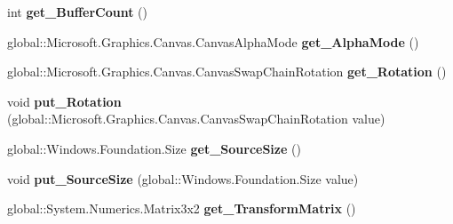 \begin{DoxyCompactItemize}
\item 
\mbox{\label{interface_microsoft_1_1_graphics_1_1_canvas_1_1_i_canvas_swap_chain_a33e552e317fa0af44a3768d918cfc3b1}} 
int {\bfseries get\+\_\+\+Buffer\+Count} ()
\item 
\mbox{\label{interface_microsoft_1_1_graphics_1_1_canvas_1_1_i_canvas_swap_chain_aec4483702807638006acc34e237b1e23}} 
global\+::\+Microsoft.\+Graphics.\+Canvas.\+Canvas\+Alpha\+Mode {\bfseries get\+\_\+\+Alpha\+Mode} ()
\item 
\mbox{\label{interface_microsoft_1_1_graphics_1_1_canvas_1_1_i_canvas_swap_chain_a8e56717493f8cd2abe583fe0b23dbc81}} 
global\+::\+Microsoft.\+Graphics.\+Canvas.\+Canvas\+Swap\+Chain\+Rotation {\bfseries get\+\_\+\+Rotation} ()
\item 
\mbox{\label{interface_microsoft_1_1_graphics_1_1_canvas_1_1_i_canvas_swap_chain_a931e117cf8d541e0154abccf052807fb}} 
void {\bfseries put\+\_\+\+Rotation} (global\+::\+Microsoft.\+Graphics.\+Canvas.\+Canvas\+Swap\+Chain\+Rotation value)
\item 
\mbox{\label{interface_microsoft_1_1_graphics_1_1_canvas_1_1_i_canvas_swap_chain_ae2841a44387495cf2aecbadd50cae216}} 
global\+::\+Windows.\+Foundation.\+Size {\bfseries get\+\_\+\+Source\+Size} ()
\item 
\mbox{\label{interface_microsoft_1_1_graphics_1_1_canvas_1_1_i_canvas_swap_chain_a2d4805496ff1ec4619b1157a60720971}} 
void {\bfseries put\+\_\+\+Source\+Size} (global\+::\+Windows.\+Foundation.\+Size value)
\item 
\mbox{\label{interface_microsoft_1_1_graphics_1_1_canvas_1_1_i_canvas_swap_chain_ad0ee43ededec68f0e33cd0f0ce1cbb35}} 
global\+::\+System.\+Numerics.\+Matrix3x2 {\bfseries get\+\_\+\+Transform\+Matrix} ()
\item 

\end{DoxyCompactItemize}
